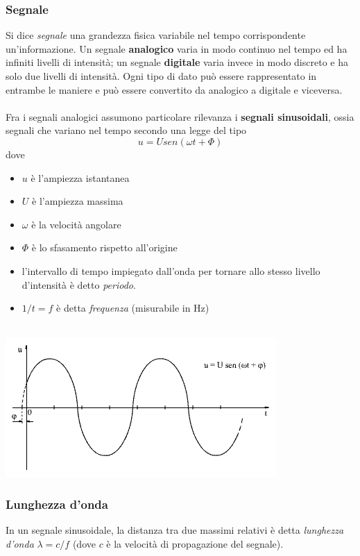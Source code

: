 \documentclass[a4paper,11pt]{paper}
\begin{document}
\subsubsection{Segnale}
Si dice \textit{segnale} una grandezza fisica variabile nel tempo corrispondente un'informazione. Un segnale \textbf{analogico} varia in modo continuo nel tempo ed ha infiniti livelli di intensità; un segnale \textbf{digitale} varia invece in modo discreto e ha solo due livelli di intensità. Ogni tipo di dato può essere rappresentato in entrambe le maniere e può essere convertito da analogico a digitale e viceversa.
\\\\Fra i segnali analogici assumono particolare rilevanza i \textbf{segnali sinusoidali}, ossia segnali che variano nel tempo secondo una legge del tipo \[u=Usen(\omega t+\Phi )\] dove 
\begin{itemize}
\item $u$ è l'ampiezza istantanea
\item $U$ è l'ampiezza massima
\item $\omega $ è la velocità angolare %
\item $\Phi $ è lo sfasamento rispetto all'origine
\item l'intervallo di tempo impiegato dall'onda per tornare allo stesso livello d'intensità è detto \textit{periodo}.
\item $1/t=f$ è detta \textit{frequenza} (misurabile in Hz)\\\\
\end{itemize}
\includegraphics[scale=0.5]{segnali_sin.png}

\subsubsection{Lunghezza d'onda}
In un segnale sinusoidale, la distanza tra due massimi relativi è detta \textit{lunghezza d'onda} $\lambda =c/f$ (dove $c$ è la velocità di propagazione del segnale).
\end{document}
